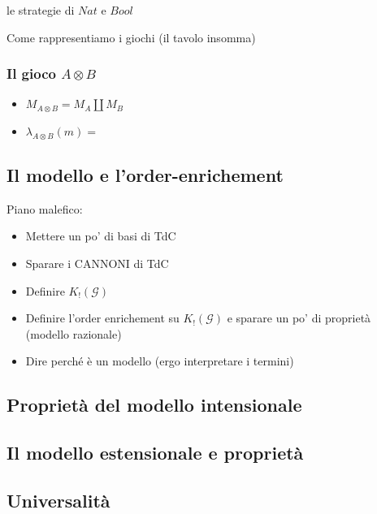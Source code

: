 \documentclass{beamer}
\begin{document}
\begin{frame}
	
	\begin{example}
		le strategie di $Nat$ e $Bool$
	\end{example}
	
\end{frame}

\begin{frame}
	
	Come rappresentiamo i giochi (il tavolo insomma)
	
\end{frame}

\begin{frame}
	
	\frametitle{Il gioco $A \otimes B$}
	
	\begin{itemize}
		\item $M_{A\otimes B}=M_A \coprod M_B$
		\item $\lambda_{A\otimes B}(m)=$
	\end{itemize}

	
\end{frame}








\subsection{Il modello e l'order-enrichement}

\begin{frame}
	Piano malefico:
	\begin{itemize}
	\item	Mettere un po' di basi di TdC
	\item Sparare i CANNONI di TdC
	\item Definire $K_! (\mathcal{G})$
	\item Definire l'order enrichement su $K_! (\mathcal{G})$ e sparare un po' di proprietà (modello razionale)
	\item Dire perché è un modello (ergo interpretare i termini)
	\end{itemize}
\end{frame}


\subsection{Proprietà del modello intensionale}
\subsection{Il modello estensionale e proprietà}
\subsection{Universalità}
\end{document}
